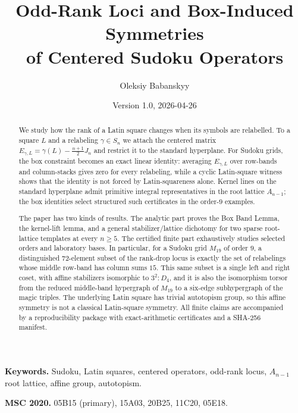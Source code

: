 \documentclass[11pt,a4paper]{article}
\title{Odd-Rank Loci and Box-Induced Symmetries\\
       of Centered Sudoku Operators}
\author{Oleksiy Babanskyy}
\date{Version 1.0, 2026-04-26}
\theoremstyle{definition}
\theoremstyle{remark}
\begin{document}
\maketitle

\begin{abstract}
We study how the rank of a Latin square changes when its symbols are
relabelled.  To a square $L$ and a relabeling $\gamma\in S_n$ we attach
the centered matrix $E_{\gamma,L}=\gamma(L)-\tfrac{n+1}{2}J_n$ and
restrict it to the standard hyperplane.  For Sudoku grids, the box
constraint becomes an exact linear identity: averaging $E_{\gamma,L}$
over row-bands and column-stacks gives zero for every relabeling, while
a cyclic Latin-square witness shows that the identity is not forced by
Latin-squareness alone.  Kernel lines on the standard hyperplane admit
primitive integral representatives in the root lattice $A_{n-1}$; the
box identities select structured such certificates in the order-$9$
examples.

The paper has two kinds of results.  The analytic part proves the Box
Band Lemma, the kernel-lift lemma, and a general stabilizer/lattice
dichotomy for two sparse root-lattice templates at every $n\ge 5$.
The certified finite part exhaustively studies selected orders and
laboratory bases.  In particular, for a Sudoku grid $M_{19}$ of order
$9$, a distinguished $72$-element subset of the rank-drop locus is
exactly the set of relabelings whose middle row-band has column sums
$15$.  This same subset is a single left and right coset, with affine
stabilizers isomorphic to $3^2{:}D_4$, and it is also the isomorphism
torsor from the reduced middle-band hypergraph of $M_{19}$ to a
six-edge subhypergraph of the magic triples.  The underlying Latin
square has trivial autotopism group, so this affine symmetry is not a
classical Latin-square symmetry.  All finite claims are accompanied by
a reproducibility package with exact-arithmetic certificates and a
SHA-256 manifest.
\end{abstract}

\noindent\textbf{Keywords.} Sudoku, Latin squares, centered operators,
odd-rank locus, $A_{n-1}$ root lattice, affine group, autotopism.

\smallskip
\noindent\textbf{MSC 2020.} 05B15 (primary), 15A03, 20B25, 11C20, 05E18.
\end{document}
